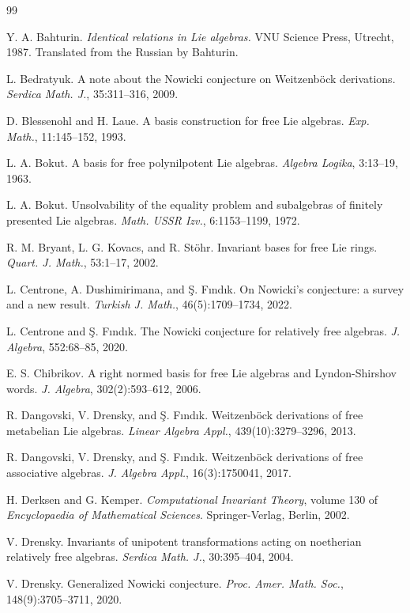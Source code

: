 \documentclass{cimart}
\begin{document}
\begin{thebibliography}{99}

 Y. A. Bahturin. {\it Identical relations in Lie algebras.} VNU Science Press, Utrecht, 1987.
Translated from the Russian by Bahturin.

 L. Bedratyuk. A note about the Nowicki conjecture on Weitzenb\"ock derivations. {\it Serdica
Math. J.}, 35:311–316, 2009.

 D. Blessenohl and H. Laue. A basis construction for free Lie algebras. {\it Exp. Math.}, 11:145–152, 1993.

 L. A. Bokut. A basis for free polynilpotent Lie algebras. {\it Algebra Logika}, 3:13–19, 1963.

 L. A. Bokut. Unsolvability of the equality problem and subalgebras of finitely presented Lie algebras. {\it Math. USSR Izv.}, 6:1153–1199, 1972.

 R. M. Bryant, L. G. Kovacs, and R. St\"ohr. Invariant bases for free Lie rings. {\it Quart. J. Math.}, 53:1–17, 2002.

 L. Centrone, A. Dushimirimana, and {\c S}. F{\i}nd{\i}k. On Nowicki’s conjecture: a survey and a
new result. {\it Turkish J. Math.}, 46(5):1709–1734, 2022.

 L. Centrone and {\c S}. F{\i}nd{\i}k. The Nowicki conjecture for relatively free algebras. {\it J. Algebra}, 552:68–85, 2020.

 E. S. Chibrikov. A right normed basis for free Lie algebras and Lyndon-Shirshov words. {\it J.
Algebra}, 302(2):593–612, 2006.

 R. Dangovski, V. Drensky, and {\c S}. F{\i}nd{\i}k. Weitzenb\"ock derivations of free metabelian Lie
algebras. {\it Linear Algebra Appl.}, 439(10):3279–3296, 2013.

 R. Dangovski, V. Drensky, and {\c S}. F{\i}nd{\i}k. Weitzenböck derivations of free associative algebras. {\it J. Algebra Appl.}, 16(3):1750041, 2017.

 H. Derksen and G. Kemper. {\it Computational Invariant Theory}, volume 130 of {\it Encyclopaedia
of Mathematical Sciences}. Springer-Verlag, Berlin, 2002.

 V. Drensky. Invariants of unipotent transformations acting on noetherian relatively free
algebras. {\it Serdica Math. J.}, 30:395–404, 2004. 

 V. Drensky. Generalized Nowicki conjecture. {\it Proc. Amer. Math. Soc.}, 148(9):3705–3711, 2020.


\end{thebibliography}
\end{document}
